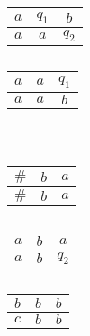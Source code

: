 \documentclass[b5paper]{book}
\theoremstyle{definition}
\newenvironment{pf*}{\pushQED{\qed}\pf}{\popQED\endpf}
\begin{document}
\begin{pf*}
\begin{table}[!ht]
        \begin{subtable}[h]{0.3\textwidth}
            \centering
            \begin{tabular}{ | c | c | c|}
            \hline 
            $a$ & $q_1$ & $b$ \\ 
            \hline 
            $a$ & $a$ & $q_2$ \\ 
            \hline
           \end{tabular}
           \caption{}
        \end{subtable}
        \hfill
        \begin{subtable}[h]{0.3\textwidth}
            \centering
            \begin{tabular}{ | c | c | c|}
            \hline 
            $a$ & $a$ & $q_1$ \\ 
            \hline 
            $a$ & $a$ & $b$ \\ 
            \hline
           \end{tabular}
           \caption{}
        \end{subtable}\\
        \begin{subtable}[h]{0.3\textwidth}
            \centering
            \begin{tabular}{ | c | c | c|}
            \hline 
            $\#$ & $b$ & $a$ \\ 
            \hline 
            $\#$ & $b$ & $a$ \\ 
            \hline
           \end{tabular}
           \caption{}
        \end{subtable}
        \hfill
        \begin{subtable}[h]{0.3\textwidth}
            \centering
            \begin{tabular}{ | c | c | c|}
            \hline 
            $a$ & $b$ & $a$ \\ 
            \hline 
            $a$ & $b$ & $q_2$ \\ 
            \hline
           \end{tabular}
           \caption{}
        \end{subtable}
        \hfill
        \begin{subtable}[h]{0.3\textwidth}
            \centering
            \begin{tabular}{ | c | c | c|}
            \hline 
            $b$ & $b$ & $b$ \\ 
            \hline 
            $c$ & $b$ & $b$ \\ 

\end{tabular}
\end{subtable}
\end{table}
\end{pf*}
\end{document}
